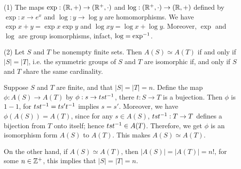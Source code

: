 \begin{example}\label{example_1.12}
  \begin{enumerate}
    \item[(1)] The maps $\exp: (\mathbb{R},+) \rightarrow (\mathbb{R}^+, \cdot)$ and
      $\log: (\mathbb{R}^+, \cdot) \rightarrow (\mathbb{R},+)$ defined by $\exp:x
      \rightarrow e^x$ and $\log:y \rightarrow \log{y}$ are homomorphisms.
      We have $\exp{x+y}=\exp{x}\exp{y}$ and $\log{xy}=\log{x}+\log{y}$.
      Moreover, $\exp$ and  $\log$ are group isomorphisms, infact,
      $\log=\exp^{-1}$.

    \item[(2)] Let $S$ and  $T$ be nonempty finite sets. Then  $A(S) \simeq
      A(T)$ if and only if $|S|=|T|$, i.e. the symmetric groups of  $S$
      and  $T$ are isomorphic if, and only if  $S$ and  $T$ share the same
      cardinality.

      Suppose $S$ and  $T$ are finite, and that  $|S|=|T|=n$. Define  the
      map  $\phi:A(S) \rightarrow A(T)$ by $\phi:s \rightarrow tst^{-1}$,
      there $t:S \rightarrow T$ is a bujection. Then $\phi$ is $1-1$, for
      $tst^{-1}=ts't^{-1}$ implies $s=s'$. Moreover, we have
      $\phi(A(S))=A(T)$, since for any $s \in A(S)$, $tst^{-1}:T
      \rightarrow T$ defines a bijection from $T$ onto itself; hence
      $tst^{-1} \in A(T)$. Therefore, we get $\phi$ is an isomorphism
      form  $A(S)$ to $A(T)$. This makes $A(S) \simeq A(T)$.

      On the other hand, if  $A(S) \simeq A(T)$, then $|A(S)|=
      |A(T)|=n!$, for some $n \in \mathbb{Z}^+$, this implies that
      $|S|=|T|=n$.
  \end{enumerate}
\end{example}

